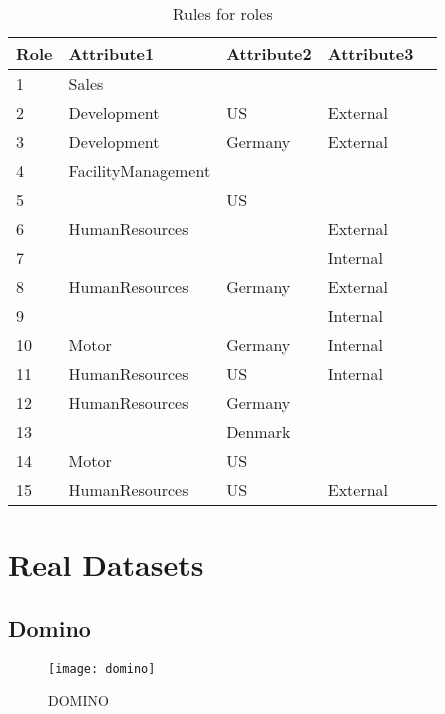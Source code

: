 		\begin{table}[H]
			\centering
			\caption{Rules for roles}
			\label{tab:dataset2_rules}
			\begin{tabular}{|l|l|l|l|l|}
				\hline
				\rowcolor[HTML]{EFEFEF} 
				Role & Attribute1         & Attribute2 & Attribute3   \\ \hline
				1    & Sales              &            &              \\ \hline
				2    & Development        & US         & External     \\ \hline
				3    & Development        & Germany    & External     \\ \hline
				4    & FacilityManagement &            &              \\ \hline
				5    &                    & US         &              \\ \hline
				6    & HumanResources     &            & External     \\ \hline
				7    &                    &            & Internal     \\ \hline
				8    & HumanResources     & Germany    & External     \\ \hline
				9    &                    &            & Internal     \\ \hline
				10   & Motor              & Germany    & Internal     \\ \hline
				11   & HumanResources     & US         & Internal     \\ \hline
				12   & HumanResources     & Germany    &              \\ \hline
				13   &                    & Denmark    &              \\ \hline
				14   & Motor              & US         &              \\ \hline
				15   & HumanResources     & US         & External     \\ \hline
			\end{tabular}
		\end{table}

\section{Real Datasets}
\label{sec:A_real_datasets}
	\subsection{Domino}
		\begin{figure}[H]
			\centering
			\texttt{[image: domino]}
			\caption{DOMINO}
			\label{fig:domino}
		\end{figure}